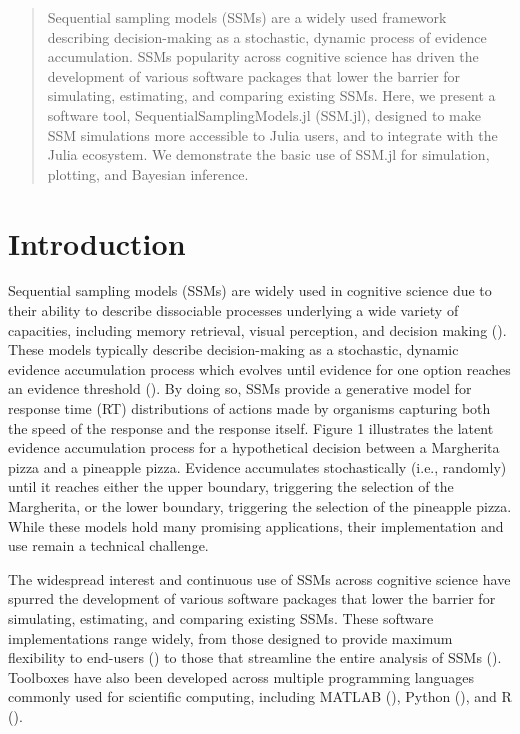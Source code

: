 \documentclass{juliacon}
\begin{document}


\maketitle

\begin{abstract}

Sequential sampling models (SSMs) are a widely used framework describing decision-making as a stochastic, dynamic process of evidence accumulation. SSMs popularity across cognitive science has driven the development of various software packages that lower the barrier for simulating, estimating, and comparing existing SSMs. Here, we present a software tool, SequentialSamplingModels.jl (SSM.jl), designed to make SSM simulations more accessible to Julia users, and to integrate with the Julia ecosystem. We demonstrate the basic use of SSM.jl for simulation, plotting, and Bayesian inference.

\end{abstract}

\section{Introduction}
Sequential sampling models (SSMs) are widely used in cognitive science due to their ability to describe dissociable processes underlying a wide variety of capacities, including memory retrieval, visual perception, and decision making (\cite{forstmann2016sequential}). These models typically describe decision-making as a stochastic, dynamic evidence accumulation process which evolves until evidence for one option reaches an evidence threshold (\cite{smith2000stochastic,Ratcliff2008TheDD,Ratcliff1978ATO}). By doing so, SSMs provide a generative model for response time (RT) distributions of actions made by organisms capturing both the speed of the response and the response itself. Figure 1 illustrates the latent evidence accumulation process for a hypothetical decision between a Margherita pizza and a pineapple pizza. Evidence accumulates stochastically (i.e., randomly) until it reaches either the upper boundary, triggering the selection of the Margherita, or the lower boundary, triggering the selection of the pineapple pizza. While these models hold many promising applications, their implementation and use remain a technical challenge.

The widespread interest and continuous use of SSMs across cognitive science have spurred the development of various software packages that lower the barrier for simulating, estimating, and comparing existing SSMs. These software implementations range widely, from those designed to provide maximum flexibility to end-users (\cite{Shinn2020AFF}) to those that streamline the entire analysis of SSMs (\cite{Fengler2022BeyondDD}). Toolboxes have also been developed across multiple programming languages commonly used for scientific computing, including MATLAB (\cite{vandekerckhove2008diffusion}), Python (\cite{wiecki2013hddm, Shinn2020AFF, Fengler2022BeyondDD, murrow2024pybeam}), and R (\cite{wabersich2014rwiener,stevenson2024emc2, hBayesDM,singmann2018package, hartmann2021partial}).
\end{document}

